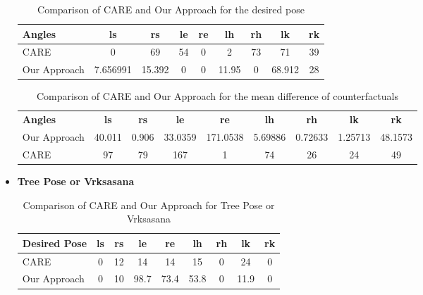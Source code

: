 \begin{itemize}
\begin{table}[H]
\centering
\begin{tabular}{|>{\centering\arraybackslash}m{3.5cm}|c|c|c|c|c|c|c|c|}
\hline
\rowcolor[HTML]{FAE5D3}%
\textbf{Angles} & \textbf{ls} & \textbf{rs} & \textbf{le} & \textbf{re} & \textbf{lh} & \textbf{rh} & \textbf{lk} & \textbf{rk} \\ \hline
CARE & 0 & 69 & 54 & 0 & 2 & 73 & 71 & 39 \\ \hline
Our Approach & 7.656991 & 15.392 & 0 & 0 & 11.95 & 0 & 68.912 & 28 \\ \hline
\end{tabular}
\caption{Comparison of CARE and Our Approach for the desired pose}
\end{table}
\begin{table}[h!]
\centering
\begin{tabular}{|>{\centering\arraybackslash}m{3.5cm}|c|c|c|c|c|c|c|c|}
\hline
\rowcolor[HTML]{FAE5D3}
\multicolumn{9}{|c|}{\textbf{Mean of difference of Counterfactuals}} \\ \hline
\rowcolor[HTML]{FAE5D3}
\textbf{Angles} & \textbf{ls} & \textbf{rs} & \textbf{le} & \textbf{re} & \textbf{lh} & \textbf{rh} & \textbf{lk} & \textbf{rk} \\ \hline
Our Approach & 40.011 & 0.906 & 33.0359 & 171.0538 & 5.69886 & 0.72633 & 1.25713 & 48.1573 \\ \hline
CARE & 97 & 79 & 167 & 1 & 74 & 26 & 24 & 49 \\ \hline
\end{tabular}
\caption{Comparison of CARE and Our Approach for the mean difference of counterfactuals}
\end{table}


\item \textbf{Tree Pose or Vrksasana} \newline
\begin{table}[h!]
\centering
\begin{tabular}{|>{\centering\arraybackslash}m{3.5cm}|c|c|c|c|c|c|c|c|}
\hline
\rowcolor[HTML]{D3D3D3} %

\textbf{Desired Pose} & \textbf{ls} & \textbf{rs} & \textbf{le} & \textbf{re} & \textbf{lh} & \textbf{rh} & \textbf{lk} & \textbf{rk} \\ \hline
CARE & 0 & 12 & 14 & 14 & 15 & 0 & 24 & 0 \\ \hline
Our Approach & 0 & 10 & 98.7 & 73.4 & 53.8 & 0 & 11.9 & 0 \\ \hline
\end{tabular}
\caption{Comparison of CARE and Our Approach for Tree Pose or Vrksasana}
\end{table}


\end{itemize}
